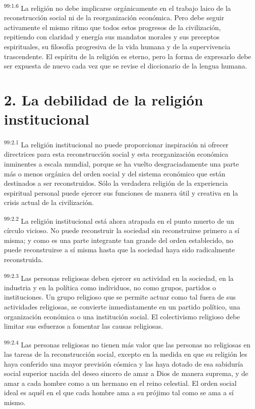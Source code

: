 \documentclass[twoside, 11pt]{book}
\begin{document}
\par
\textsuperscript{99:1.6} La religión no debe implicarse orgánicamente en el trabajo laico de la reconstrucción social ni de la reorganización económica. Pero debe seguir activamente el mismo ritmo que todos estos progresos de la civilización, repitiendo con claridad y energía sus mandatos morales y sus preceptos espirituales, su filosofía progresiva de la vida humana y de la supervivencia trascendente. El espíritu de la religión es eterno, pero la forma de expresarlo debe ser expuesta de nuevo cada vez que se revise el diccionario de la lengua humana.

\section*{2. La debilidad de la religión institucional}
\par
\textsuperscript{99:2.1} La religión institucional no puede proporcionar inspiración ni ofrecer directrices para esta reconstrucción social y esta reorganización económica inminentes a escala mundial, porque se ha vuelto desgraciadamente una parte más o menos orgánica del orden social y del sistema económico que están destinados a ser reconstruidos. Sólo la verdadera religión de la experiencia espiritual personal puede ejercer sus funciones de manera útil y creativa en la crisis actual de la civilización.

\par
\textsuperscript{99:2.2} La religión institucional está ahora atrapada en el punto muerto de un círculo vicioso. No puede reconstruir la sociedad sin reconstruirse primero a sí misma; y como es una parte integrante tan grande del orden establecido, no puede reconstruirse a sí misma hasta que la sociedad haya sido radicalmente reconstruida.

\par
\textsuperscript{99:2.3} Las personas religiosas deben ejercer su actividad en la sociedad, en la industria y en la política como individuos, no como grupos, partidos o instituciones. Un grupo religioso que se permite actuar como tal fuera de sus actividades religiosas, se convierte inmediatamente en un partido político, una organización económica o una institución social. El colectivismo religioso debe limitar sus esfuerzos a fomentar las causas religiosas.

\par
\textsuperscript{99:2.4} Las personas religiosas no tienen más valor que las personas no religiosas en las tareas de la reconstrucción social, excepto en la medida en que su religión les haya conferido una mayor previsión cósmica y las haya dotado de esa sabiduría social superior nacida del deseo sincero de amar a Dios de manera suprema, y de amar a cada hombre como a un hermano en el reino celestial. El orden social ideal es aquél en el que cada hombre ama a su prójimo tal como se ama a sí mismo.
\end{document}
